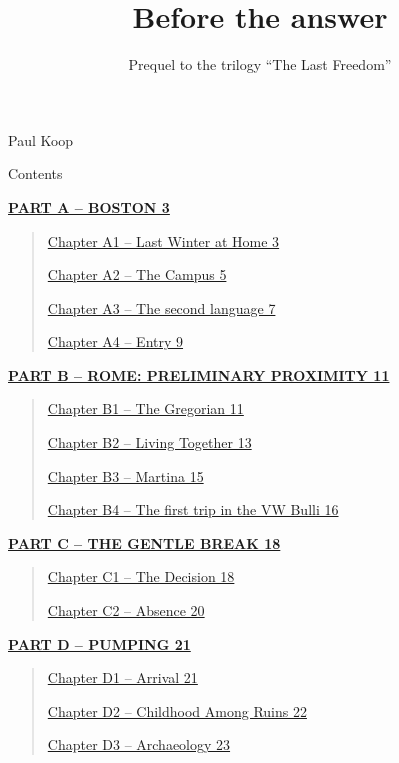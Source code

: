 \documentclass[
]{article}
\title{\protect\phantomsection\label{_s0a7ddwuqehv}{}Before the answer}
\subtitle{\protect\phantomsection\label{_o9ks49jgkq76}{}Prequel to the trilogy ``The Last Freedom''}
\author{}
\date{}
\begin{document}
\maketitle

{
\setcounter{tocdepth}{3}
\tableofcontents
}
Paul Koop

Contents

\hyperref[part-a-boston]{\textbf{PART A -- BOSTON 3}}

\begin{quote}
\hyperref[chapter-a1-last-winter-at-home]{Chapter A1 -- Last Winter at Home 3}

\hyperref[chapter-a2-the-campus]{Chapter A2 -- The Campus 5}

\hyperref[chapter-a3-the-second-language]{Chapter A3 -- The second language 7}

\hyperref[chapter-a4-entry]{Chapter A4 -- Entry 9}
\end{quote}

\hyperref[part-b-rome-preliminary-proximity]{\textbf{PART B -- ROME: PRELIMINARY PROXIMITY 11}}

\begin{quote}
\hyperref[chapter-b1-gregorian-calendar]{Chapter B1 -- The Gregorian 11}

\hyperref[kapitel-b2-living-together]{Chapter B2 -- Living Together 13}

\hyperref[chapter-b3-martina]{Chapter B3 -- Martina 15}

\hyperref[chapter-b4-the-first-trip-in-the-vw-bulli]{Chapter B4 -- The first trip in the VW Bulli 16}
\end{quote}

\hyperref[part-c-the-gentle-break]{\textbf{PART C -- THE GENTLE BREAK 18}}

\begin{quote}
\hyperref[chapter-c1-the-decision]{Chapter C1 -- The Decision 18}

\hyperref[chapter-c2-absence]{Chapter C2 -- Absence 20}
\end{quote}

\hyperref[part-d-pumping]{\textbf{PART D -- PUMPING 21}}

\begin{quote}
\hyperref[chapter-d1-arrival]{Chapter D1 -- Arrival 21}

\hyperref[chapter-d2-childhood-among-ruins]{Chapter D2 -- Childhood Among Ruins 22}

\hyperref[chapter-d3-archaeology]{Chapter D3 -- Archaeology 23}
\end{quote}
\end{document}

